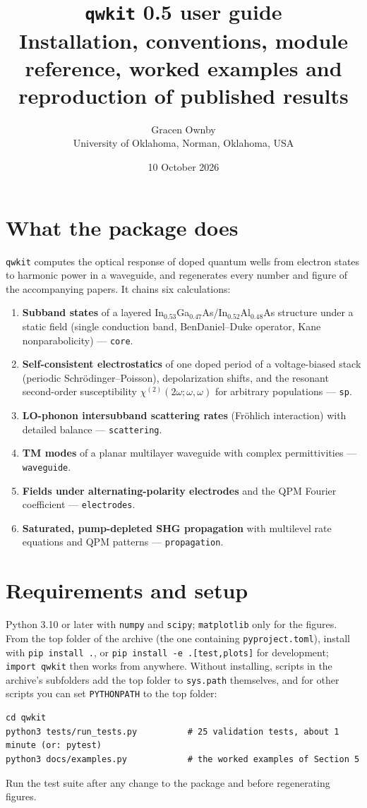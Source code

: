 \documentclass[11pt]{article}
\title{\texttt{qwkit} 0.5 user guide\\[2pt]\large Installation, conventions, module reference, worked examples and reproduction of published results}
\author{Gracen Ownby\\ \small University of Oklahoma, Norman, Oklahoma, USA}
\date{\small 10 October 2026}
\newcommand{\code}[1]{\texttt{#1}}
\begin{document}
\maketitle
\tableofcontents

\section{What the package does}
\code{qwkit} computes the optical response of doped quantum wells from electron states to harmonic power in a waveguide, and regenerates every number and figure of the accompanying papers. It chains six calculations:
\begin{enumerate}
\item \textbf{Subband states} of a layered In$_{0.53}$Ga$_{0.47}$As/In$_{0.52}$Al$_{0.48}$As structure under a static field (single conduction band, BenDaniel--Duke operator, Kane nonparabolicity) --- \code{core}.
\item \textbf{Self-consistent electrostatics} of one doped period of a voltage-biased stack (periodic Schr\"odinger--Poisson), depolarization shifts, and the resonant second-order susceptibility $\chi^{(2)}(2\omega;\omega,\omega)$ for arbitrary populations --- \code{sp}.
\item \textbf{LO-phonon intersubband scattering rates} (Fr\"ohlich interaction) with detailed balance --- \code{scattering}.
\item \textbf{TM modes} of a planar multilayer waveguide with complex permittivities --- \code{waveguide}.
\item \textbf{Fields under alternating-polarity electrodes} and the QPM Fourier coefficient --- \code{electrodes}.
\item \textbf{Saturated, pump-depleted SHG propagation} with multilevel rate equations and QPM patterns --- \code{propagation}.
\end{enumerate}

\section{Requirements and setup}
Python 3.10 or later with \code{numpy} and \code{scipy}; \code{matplotlib} only for the figures. From the top folder of the archive (the one containing \code{pyproject.toml}), install with \code{pip install .}, or \code{pip install -e .[test,plots]} for development; \code{import qwkit} then works from anywhere. Without installing, scripts in the archive's subfolders add the top folder to \code{sys.path} themselves, and for other scripts you can set \code{PYTHONPATH} to the top folder:
\begin{lstlisting}
cd qwkit
python3 tests/run_tests.py          # 25 validation tests, about 1 minute (or: pytest)
python3 docs/examples.py            # the worked examples of Section 5
\end{lstlisting}
Run the test suite after any change to the package and before regenerating figures.
\end{document}
